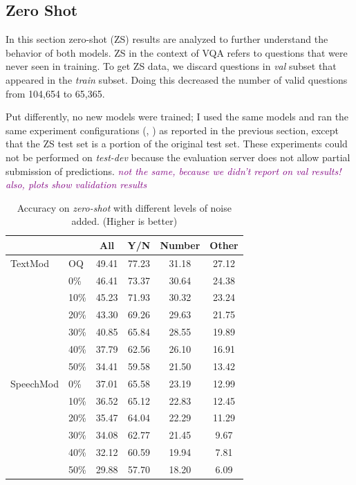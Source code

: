 \documentclass[letterpaper]{article} %
\newcommand{\tz}[1]{\textcolor{purple}{\textit{#1}}}
\begin{document}
\subsection{Zero Shot}
In this section zero-shot (ZS) results are analyzed to further understand the behavior of both models. ZS in the context of VQA refers to questions that were never seen in training. To get ZS data, we discard questions in \textit{val} subset that appeared in the \textit{train} subset. Doing this decreased the number of valid questions from 104,654 to 65,365.

Put differently, no new models were trained; I used the same models and ran the same experiment configurations (, ) as reported in the previous section, except that the ZS test set is a portion of the original test set. These experiments could not be performed on \textit{test-dev} because the evaluation server does not allow partial submission of predictions. \tz{not the same, because we didn't report on val results!} \tz{also, plots show validation results}

\begin{table}[t]
\centering
\caption{Accuracy on \textit{zero-shot} with different levels of noise added. (Higher is better)}
\label{table:zs}
\begin{tabular}{ll|cccc}
          &                     & All    & Y/N    & Number & Other \\ \hline
TextMod   & OQ                  & 49.41  & 77.23  & 31.18  & 27.12 \\
          & 0\%                 & 46.41  & 73.37  & 30.64  & 24.38 \\
          & 10\%                & 45.23  & 71.93  & 30.32  & 23.24 \\
          & 20\%                & 43.30  & 69.26  & 29.63  & 21.75 \\
          & 30\%                & 40.85  & 65.84  & 28.55  & 19.89 \\
          & 40\%                & 37.79  & 62.56  & 26.10  & 16.91 \\
          & 50\%                & 34.41  & 59.58  & 21.50  & 13.42 \\ \hline
SpeechMod & 0\%                 & 37.01  & 65.58  & 23.19  & 12.99 \\
          & 10\%                & 36.52  & 65.12  & 22.83  & 12.45 \\
          & 20\%                & 35.47  & 64.04  & 22.29  & 11.29 \\
          & 30\%                & 34.08  & 62.77  & 21.45  &  9.67 \\
          & 40\%                & 32.12  & 60.59  & 19.94  &  7.81 \\
          & 50\%                & 29.88  & 57.70  & 18.20  &  6.09 
\end{tabular}
\end{table}
\end{document}
